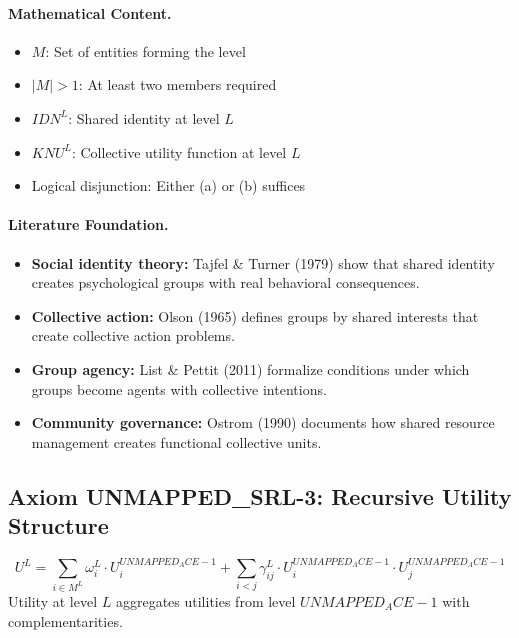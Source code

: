 \paragraph{Mathematical Content.}
\begin{itemize}
\item $M$: Set of entities forming the level
\item $|M| > 1$: At least two members required
\item $IDN^L$: Shared identity at level $L$
\item $KNU^L$: Collective utility function at level $L$
\item Logical disjunction: Either (a) or (b) suffices
\end{itemize}

\paragraph{Literature Foundation.}
\begin{itemize}
\item \textbf{Social identity theory:} Tajfel \& Turner (1979) show that shared 
identity creates psychological groups with real behavioral consequences.
\item \textbf{Collective action:} Olson (1965) defines groups by shared interests 
that create collective action problems.
\item \textbf{Group agency:} List \& Pettit (2011) formalize conditions under 
which groups become agents with collective intentions.
\item \textbf{Community governance:} Ostrom (1990) documents how shared resource 
management creates functional collective units.
\end{itemize}

\subsection{Axiom UNMAPPED_SRL-3: Recursive Utility Structure}

\begin{tcolorbox}[colback=gray!5!white, colframe=gray!75!black, title=Axiom UNMAPPED_SRL-3: Recursive Structure]
\begin{equation}
\boxed{
U^L = \sum_{i \in M^L} \omega^L_i \cdot U^{UNMAPPED_ACE-1}_i + \sum_{i < j} \gamma^L_{ij} \cdot U^{UNMAPPED_ACE-1}_i \cdot U^{UNMAPPED_ACE-1}_j
}
\end{equation}
Utility at level $L$ aggregates utilities from level $UNMAPPED_ACE-1$ with complementarities.
\end{tcolorbox}

